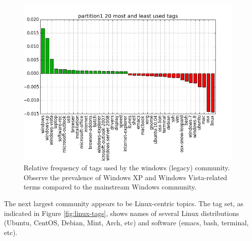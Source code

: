\documentclass[a4paper]{article}
\begin{document}
\begin{figure}
\centering
\includegraphics[width=\columnwidth]{partition1-tags}
\caption{Relative frequency of tags used by the windows (legacy) community. Observe the prevalence of Windows XP and Windows Vista-related terms compared to the mainstream Windows community.}
\label{fig:windows-tags1}
\end{figure}


The next largest community appears to be Linux-centric topics. The tag set, as indicated in Figure \ref{fig:linux-tags}, shows names of several Linux distributions (Ubuntu, CentOS, Debian, Mint, Arch, etc) and software (emacs, bash, terminal, etc).
\end{document}
